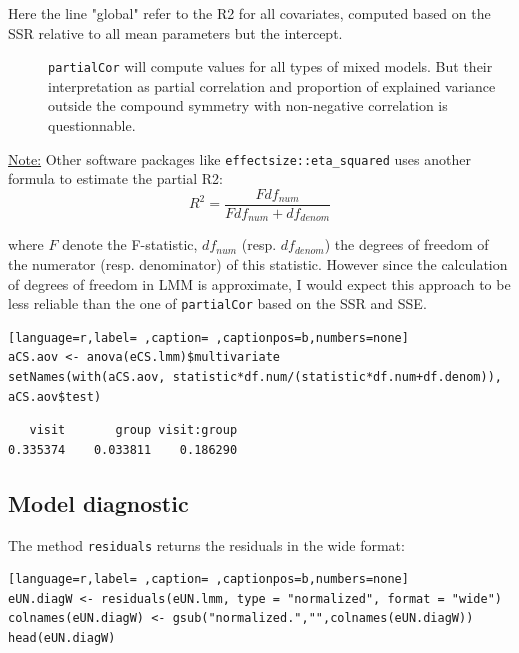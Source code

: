 \documentclass[12pt]{article}
\newcommand\Warning[1][3ex]{%
\renewcommand\stacktype{L}%
\scaleto{\stackon[1.3pt]{\color{red}$\triangle$}{\tiny\bfseries !}}{#1}%
\xspace
}
\begin{document}
Here the line "global" refer to the R2 for all covariates, computed
based on the SSR relative to all mean parameters but the intercept.
\begin{description}
\item[{\Warning}] \texttt{partialCor} will compute values for all types of mixed
models. But their interpretation as partial correlation and
proportion of explained variance outside the compound symmetry with
non-negative correlation is questionnable.
\end{description}

\bigskip

\uline{Note:} Other software packages like \texttt{effectsize::eta\_squared} uses
another formula to estimate the partial R2:
\[ R^2=\frac{F df_{num}}{F df_{num} + df_{denom}} \]

where \(F\) denote the F-statistic, \(df_{num}\)
(resp. \(df_{denom}\)) the degrees of freedom of the numerator
(resp. denominator) of this statistic. However since the calculation
of degrees of freedom in LMM is approximate, I would expect this
approach to be less reliable than the one of \texttt{partialCor} based on the
SSR and SSE.

\begin{lstlisting}[language=r,label= ,caption= ,captionpos=b,numbers=none]
aCS.aov <- anova(eCS.lmm)$multivariate
setNames(with(aCS.aov, statistic*df.num/(statistic*df.num+df.denom)), aCS.aov$test)
\end{lstlisting}

\begin{verbatim}
   visit       group visit:group 
0.335374    0.033811    0.186290
\end{verbatim}



\bigskip


\clearpage

\subsection{Model diagnostic}
\label{sec:org901032b}

The method \texttt{residuals} returns the residuals in the wide format:
\begin{lstlisting}[language=r,label= ,caption= ,captionpos=b,numbers=none]
eUN.diagW <- residuals(eUN.lmm, type = "normalized", format = "wide")
colnames(eUN.diagW) <- gsub("normalized.","",colnames(eUN.diagW))
head(eUN.diagW)
\end{lstlisting}
\end{document}
